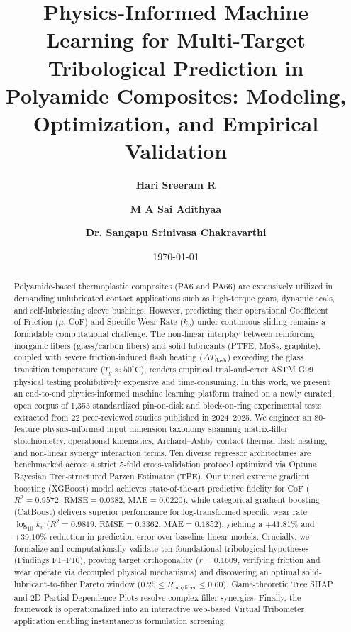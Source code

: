\documentclass[10pt,twocolumn,a4paper]{article}
\title{\textbf{\Large Physics-Informed Machine Learning for Multi-Target Tribological Prediction in Polyamide Composites: Modeling, Optimization, and Empirical Validation}}
\author[1]{\textbf{Hari Sreeram R}}
\author[1]{\textbf{M A Sai Adithyaa}}
\author[1,*]{\textbf{Dr. Sangapu Srinivasa Chakravarthi}}
\affil[1]{Department of Computer Science and Engineering, Amrita School of Computing, Amrita Vishwa Vidyapeetham, Chennai, India}
\affil[*]{Corresponding author. Email: s\_chakravarthi@ch.amrita.edu}
\date{\today}
\begin{document}
\maketitle

\begin{abstract}
Polyamide-based thermoplastic composites (PA6 and PA66) are extensively utilized in demanding unlubricated contact applications such as high-torque gears, dynamic seals, and self-lubricating sleeve bushings. However, predicting their operational Coefficient of Friction ($\mu$, CoF) and Specific Wear Rate ($k_v$) under continuous sliding remains a formidable computational challenge. The non-linear interplay between reinforcing inorganic fibers (glass/carbon fibers) and solid lubricants (PTFE, $\text{MoS}_2$, graphite), coupled with severe friction-induced flash heating ($\Delta T_{\text{flash}}$) exceeding the glass transition temperature ($T_g \approx 50^\circ\text{C}$), renders empirical trial-and-error ASTM G99 physical testing prohibitively expensive and time-consuming. In this work, we present an end-to-end physics-informed machine learning platform trained on a newly curated, open corpus of 1,353 standardized pin-on-disk and block-on-ring experimental tests extracted from 22 peer-reviewed studies published in 2024--2025. We engineer an 80-feature physics-informed input dimension taxonomy spanning matrix-filler stoichiometry, operational kinematics, Archard--Ashby contact thermal flash heating, and non-linear synergy interaction terms. Ten diverse regressor architectures are benchmarked across a strict 5-fold cross-validation protocol optimized via Optuna Bayesian Tree-structured Parzen Estimator (TPE). Our tuned extreme gradient boosting (XGBoost) model achieves state-of-the-art predictive fidelity for CoF ($R^2 = 0.9572$, $\text{RMSE} = 0.0382$, $\text{MAE} = 0.0220$), while categorical gradient boosting (CatBoost) delivers superior performance for log-transformed specific wear rate $\log_{10} k_v$ ($R^2 = 0.9819$, $\text{RMSE} = 0.3362$, $\text{MAE} = 0.1852$), yielding a $+41.81\%$ and $+39.10\%$ reduction in prediction error over baseline linear models. Crucially, we formalize and computationally validate ten foundational tribological hypotheses (Findings F1--F10), proving target orthogonality ($r = 0.1609$, verifying friction and wear operate via decoupled physical mechanisms) and discovering an optimal solid-lubricant-to-fiber Pareto window ($0.25 \le R_{\text{lub/fiber}} \le 0.60$). Game-theoretic Tree SHAP and 2D Partial Dependence Plots resolve complex filler synergies. Finally, the framework is operationalized into an interactive web-based Virtual Tribometer application enabling instantaneous formulation screening.
\end{abstract}
\end{document}
